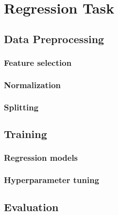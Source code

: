 \section{Regression Task}
\label{sec:regression}

\subsection{Data Preprocessing}
\label{sec:preprocessing}

\subsubsection{Feature selection}
\label{sec:preprocessing-feature-selection}

\subsubsection{Normalization}
\label{sec:preprocessing-normalization}

\subsubsection{Splitting}
\label{sec:preprocessing-splitting}

\subsection{Training}
\label{sec:training}

\subsubsection{Regression models}
\label{sec:training-regression-models}

\subsubsection{Hyperparameter tuning}
\label{sec:training-hyperparameter-tuning}

\subsection{Evaluation}
\label{sec:evaluation}
